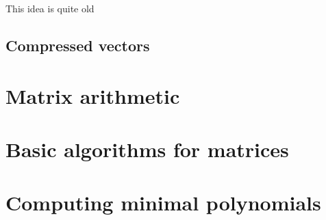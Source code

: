 This idea is quite old 

\subsection{Compressed vectors}
\label{ssec:cvec}


\section{Matrix arithmetic}
\label{sec:matarith}

\section{Basic algorithms for matrices}
\label{sec:basalgmat}

\section{Computing minimal polynomials}
\label{sec:minpoly}

